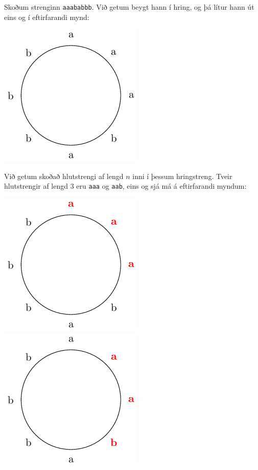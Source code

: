 
Skoðum strenginn \texttt{aaababbb}. Við getum beygt hann í hring, og þá lítur
hann út eins og í eftirfarandi mynd:

\begin{center}
\includegraphics[scale=0.4]{circle.png}
\end{center}

Við getum skoðað hlutstrengi af lengd $n$ inni í þessum hringstreng. Tveir
hlutstrengir af lengd $3$ eru \texttt{aaa} og \texttt{aab}, eins og sjá má á
eftirfarandi myndum:

\includegraphics[scale=0.4]{circle_2.png}
\includegraphics[scale=0.4]{circle_3.png}

